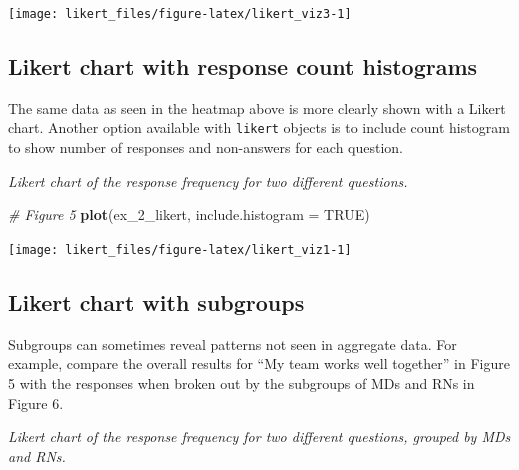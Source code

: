 \documentclass[]{book}
\newenvironment{Shaded}{\begin{snugshade}}{\end{snugshade}}
\newcommand{\KeywordTok}[1]{\textcolor[rgb]{0.13,0.29,0.53}{\textbf{{#1}}}}
\newcommand{\DataTypeTok}[1]{\textcolor[rgb]{0.13,0.29,0.53}{{#1}}}
\newcommand{\DecValTok}[1]{\textcolor[rgb]{0.00,0.00,0.81}{{#1}}}
\newcommand{\StringTok}[1]{\textcolor[rgb]{0.31,0.60,0.02}{{#1}}}
\newcommand{\CommentTok}[1]{\textcolor[rgb]{0.56,0.35,0.01}{\textit{{#1}}}}
\newcommand{\OtherTok}[1]{\textcolor[rgb]{0.56,0.35,0.01}{{#1}}}
\newcommand{\NormalTok}[1]{{#1}}
\begin{document}
\begin{center}\texttt{[image: likert\_files/figure-latex/likert\_viz3-1]} \end{center}

\subsection{Likert chart with response count
histograms}\label{likert-chart-with-response-count-histograms}

The same data as seen in the heatmap above is more clearly shown with a
Likert chart. Another option available with \texttt{likert} objects is
to include count histogram to show number of responses and non-answers
for each question.

\emph{Likert chart of the response frequency for two different
questions.}

\begin{Shaded}
\begin{Highlighting}[]
\CommentTok{# Figure 5}
\KeywordTok{plot}\NormalTok{(ex_2_likert, }\DataTypeTok{include.histogram =} \OtherTok{TRUE}\NormalTok{)}
\end{Highlighting}
\end{Shaded}

\begin{center}\texttt{[image: likert\_files/figure-latex/likert\_viz1-1]} \end{center}

\subsection{Likert chart with
subgroups}\label{likert-chart-with-subgroups}

Subgroups can sometimes reveal patterns not seen in aggregate data. For
example, compare the overall results for ``My team works well together''
in Figure 5 with the responses when broken out by the subgroups of MDs
and RNs in Figure 6.

\emph{Likert chart of the response frequency for two different
questions, grouped by MDs and RNs.}

\begin{Shaded}
\end{Shaded}
\end{document}
